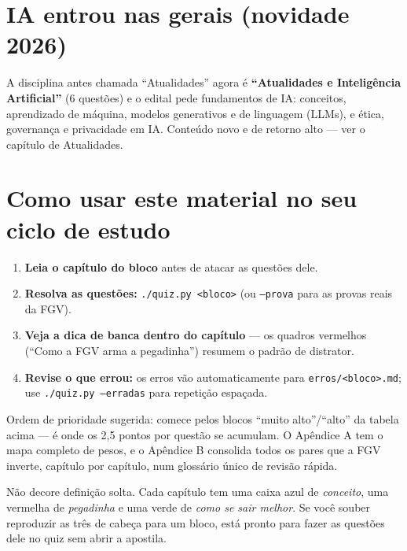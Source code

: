 \section*{IA entrou nas gerais (novidade 2026)}

A disciplina antes chamada ``Atualidades'' agora é \textbf{``Atualidades e
Inteligência Artificial''} (6 questões) e o edital pede fundamentos de IA:
conceitos, aprendizado de máquina, modelos generativos e de linguagem (LLMs),
e ética, governança e privacidade em IA. Conteúdo novo e de retorno alto ---
ver o capítulo de Atualidades.

\section*{Como usar este material no seu ciclo de estudo}

\begin{enumerate}
\item \textbf{Leia o capítulo do bloco} antes de atacar as questões dele.
\item \textbf{Resolva as questões:} \texttt{./quiz.py <bloco>} (ou
\texttt{--prova} para as provas reais da FGV).
\item \textbf{Veja a dica de banca dentro do capítulo} --- os quadros
vermelhos (``Como a FGV arma a pegadinha'') resumem o padrão de distrator.
\item \textbf{Revise o que errou:} os erros vão automaticamente para
\texttt{erros/<bloco>.md}; use \texttt{./quiz.py --erradas} para repetição
espaçada.
\end{enumerate}

Ordem de prioridade sugerida: comece pelos blocos ``muito alto''/``alto'' da
tabela acima --- é onde os 2,5 pontos por questão se acumulam. O Apêndice A
tem o mapa completo de pesos, e o Apêndice B consolida todos os pares que a
FGV inverte, capítulo por capítulo, num glossário único de revisão rápida.

\begin{comosair}
Não decore definição solta. Cada capítulo tem uma caixa azul de
\emph{conceito}, uma vermelha de \emph{pegadinha} e uma verde de \emph{como se
sair melhor}. Se você souber reproduzir as três de cabeça para um bloco, está
pronto para fazer as questões dele no quiz sem abrir a apostila.
\end{comosair}
